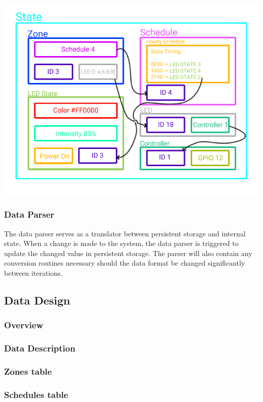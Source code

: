 \documentclass[onecolumn, draftclsnofoot,10pt, compsoc]{IEEEtran}
\begin{document}
			\begin{center}
			\includegraphics[width=\hsize]{systemDiagrams/state.png}
			\end{center}

			\subsubsection{Data Parser}
			The data parser serves as a translator between persistent storage and internal state.
			When a change is made to the system, the data parser is triggered to update the changed value in persistent storage.
			The parser will also contain any conversion routines necessary should the data format be changed significantly between iterations.


		\subsection{Data Design}
			\subsubsection{Overview}
			\subsubsection{Data Description}
			\subsubsection{Zones table}
			\subsubsection{Schedules table}
\end{document}
